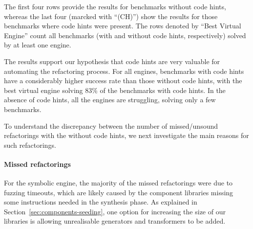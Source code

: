 \documentclass[sigconf,review,anonymous]{acmart}
\begin{document}
The first four rows provide the results for benchmarks without code hints, whereas the last four (marcked with ``(CH)'') show the results for those
benchmarks where code hints were present. The rows denoted by ``Best Virtual Engine'' count all benchmarks (with and without code hints, respectively)
solved by at least one engine.

The results support our hypothesis that code hints are very valuable for automating the refactoring process.
For all engines, benchmarks with code hints have a considerably higher success rate than those without code hints, with the best virtual
engine solving 83\% of the benchmarks with code hints. In the absence of code hints, all the engines are struggling, solving only a few benchmarks.

To understand the discrepancy between the number of missed/unsound refactorings with the without code hints,
we next investigate the main reasons for such refactorings.




%
%



\paragraph{Missed refactorings}
%
%
%
For the symbolic engine, the majority of the missed refactorings were due to fuzzing timeouts, which are likely 
caused by the component libraries missing some
instructions needed in the synthesis phase.
As explained in Section~\ref{sec:components-seeding}, one option 
for increasing the size of our libraries 
is allowing unrealisable generators and transformers to
be added.
\end{document}
